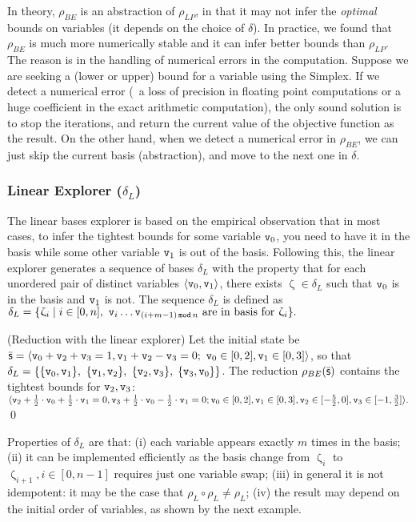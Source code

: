 \documentclass[sttt]{svjour}
\begin{document}
In theory, $\rho_{BE}$ is an abstraction of  $\rho_{LP}$, in that it may not infer the \emph{optimal} bounds on variables (it depends on the choice of $\delta$).
In practice, we found that $\rho_{BE}$ is much more numerically stable and it can infer better bounds than $\rho_{LP}$.
The reason  is in  the handling of numerical errors in the computation. 
Suppose we are seeking a (lower or upper) bound for a variable  using the Simplex. 
If we detect a numerical error (\ie\ a loss of precision in floating point computations or a huge coefficient in the exact arithmetic computation), the only sound solution is to stop the iterations, and return the current value of the objective function as the result.
On the other hand, when we detect a numerical error in $\rho_{BE}$, we can just skip the current basis (abstraction), and move to the next one in $\delta$.


\subsubsection{Linear Explorer ($\delta_L$)} The linear bases explorer  is based on the empirical observation that in most cases, to infer the tightest bounds for some variable $\mathtt{v}_0$, you need to have it in the basis while some other variable $\mathtt{v}_1$ is out of the basis.
Following this, the linear explorer generates a sequence of bases $\delta_L$  with the property that for each unordered pair of distinct variables $\langle \mathtt{v}_0, \mathtt{v}_1 \rangle$, there exists $\upzeta \in \delta_L$ such that $\mathtt{v}_0$ is in the basis and $\mathtt{v}_1$ is not.
The sequence $\delta_L$ is defined as 
\(
\delta_L = \{ \upzeta_i \mid i \in [0, n],\  \mathtt{v}_{i} \dots \mathtt{v}_{(i + m - 1)\, \mathtt{mod}\, n} \text{ are in basis for}\ \upzeta_i\}.
\)

\begin{example}(Reduction with the linear explorer)
Let the initial state be $\bar{\mathsf{\mathsf{s}}}= \langle \mathtt{v}_0 + \mathtt{v}_2 + \mathtt{v}_3 = 1, \mathtt{v}_1 + \mathtt{v}_2 - \mathtt{v}_3 = 0;\ \mathtt{v}_0 \in [0,2], \mathtt{v}_1 \in [0,3]  \rangle$, so that $\delta_L = \{ \{ \mathtt{v}_0, \mathtt{v}_1\},$  $\{ \mathtt{v}_1, \mathtt{v}_2\},$ $ \{ \mathtt{v}_2, \mathtt{v}_3 \},$ $\{\mathtt{v}_3, \mathtt{v}_0 \}\}$.
The reduction $\rho_{BE}(\bar{\mathsf{\mathsf{s}}})$ contains the tightest bounds for $\mathtt{v}_2, \mathtt{v}_3$:
\(
\langle \mathtt{v}_2 + \frac{1}{2} \cdot \mathtt{v}_0 + \frac{1}{2} \cdot \mathtt{v}_1 = 0, \mathtt{v}_3 + \frac{1}{2} \cdot \mathtt{v}_0 - \frac{1}{2} \cdot \mathtt{v}_1 = 0;
\mathtt{v}_0\in [0,2], \mathtt{v}_1 \in [0, 3], \mathtt{v}_2 \in[-\frac{5}{2}, 0], \mathtt{v}_3 \in [-1, \frac{3}{2}]  \rangle. 
\)
\qed
\end{example}
Properties of $\delta_L$ are that: (i) each variable appears exactly $m$ times in the basis; (ii) it can be implemented efficiently as the basis change from $\upzeta_i$ to $\upzeta_{i+1}, i \in [0, n-1]$ requires just one variable swap; (iii) in general it is not idempotent: it may be the case that $\rho_L \circ \rho_L \neq \rho_L$; (iv) the result may depend on the initial order of variables, as shown by the next example.
\end{document}
